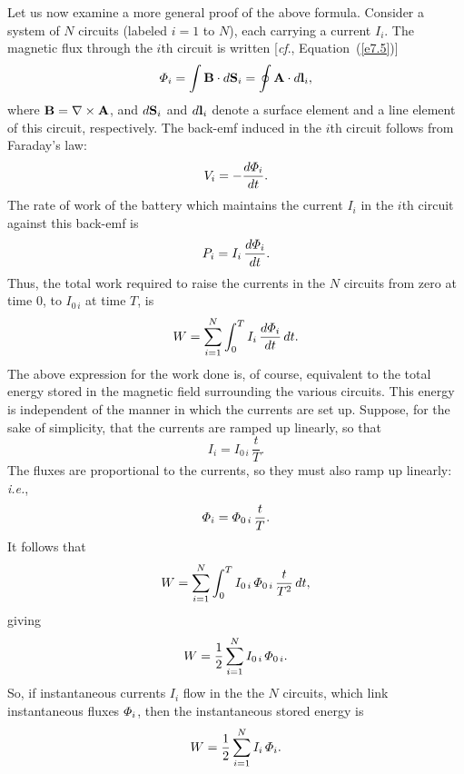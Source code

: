 Let us now examine  a more general proof of the above formula. Consider a system
of $N$ circuits   (labeled $i=1$ to $N$), each carrying a current $I_i$. 
The magnetic flux through the $i$th circuit is written [{\em cf}., Equation~(\ref{e7.5})]
\begin{equation}\label{e7.56}
{\mit\Phi}_i = \int {\bf B} \cdot d{\bf S}_i = \oint {\bf A} \cdot d{\bf l}_i,
\end{equation}
where ${\bf B} = \nabla\times{\bf A}$, and $d{\bf S}_i$ and $d{\bf l}_i$ denote a
surface element and a line element of this  circuit, respectively. The 
back-emf induced in the $i$th circuit follows from Faraday's law:
\begin{equation}
V_i = - \frac{d {\mit\Phi}_i}{dt}.
\end{equation}
The rate of work of the battery which maintains  the current $I_i$ 
in the $i$th circuit
against this back-emf is 
\begin{equation}
P_i = I_i\, \frac{d {\mit\Phi}_i}{dt}.
\end{equation}
Thus, the total work required
 to raise the currents in the $N$ circuits from zero at time
0, to $I_{0\,i}$ at time $T$, is
\begin{equation}
W = \sum_{i=1}^N \int_0^T I_i \,\frac{d{\mit\Phi}_i}{dt}\,dt.
\end{equation}
The above expression for the work done is, of course, equivalent to the total
energy stored in the magnetic field surrounding the various circuits. 
This energy is independent of the manner in which the currents
 are set up. 
Suppose, for the sake of simplicity,  that the currents are ramped up linearly,
so that
\begin{equation}
I_i = I_{0\,i}\, \frac{t}{T}.
\end{equation}
The fluxes are proportional to the currents, so they must also ramp up linearly: {\em i.e.}, 
\begin{equation}
{\mit\Phi}_i = {\mit\Phi}_{0\,i} \,\frac{t}{T}.
\end{equation}
It follows that
\begin{equation}
W = \sum_{i=1}^N \int_0^T I_{0\,i} \,{\mit\Phi}_{0\,i}\, \frac{t}{T^2}\,dt,
\end{equation}
giving
\begin{equation}
W = \frac{1}{2} \sum_{i=1}^N I_{0\,i} \,{\mit\Phi}_{0\,i}.
\end{equation}
So, if instantaneous currents $I_i$ flow in the the $N$ circuits, which link 
instantaneous fluxes ${\mit\Phi}_i$, then the instantaneous stored energy is
\begin{equation}\label{e7.64}
W= \frac{1}{2} \sum_{i=1}^N I_i \,{\mit\Phi}_i.
\end{equation}


